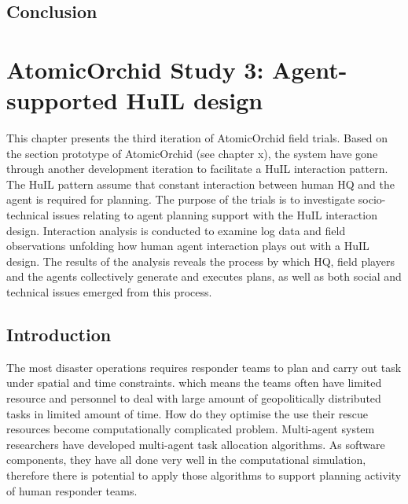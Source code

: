 
\section{Conclusion}

\chapter{AtomicOrchid Study 3: Agent-supported HuIL design}\label{ch:studythree} 
This chapter presents the third iteration of AtomicOrchid field trials. Based on the section prototype of AtomicOrchid (see chapter x), the system have gone through another development iteration to facilitate a HuIL interaction pattern. The HuIL pattern assume that constant interaction between human HQ and the  agent is required for planning. The purpose of the trials is to investigate socio-technical issues relating to agent planning support with the HuIL interaction design. Interaction analysis is conducted to examine log data and field observations unfolding how human agent interaction plays out with a HuIL design. The results of the analysis reveals the process by which HQ, field players and the agents collectively generate and executes plans, as well as  both social and technical issues emerged from this process.  \\


\section{Introduction}
The most disaster operations requires responder teams to plan and carry out task under spatial and time constraints. which means the teams often have limited resource and personnel to deal with large amount of geopolitically distributed tasks in limited amount of time. How do they optimise the use their rescue resources become computationally complicated problem. Multi-agent system researchers have developed multi-agent task allocation algorithms. As software components, they have all done very well in the computational simulation, therefore there is potential to apply those algorithms to support planning activity of human responder teams. \\

